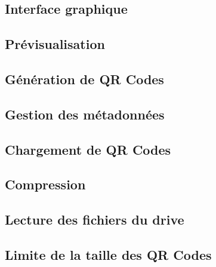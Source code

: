 \documentclass{report}
\begin{document}
		\subsection{Interface graphique}
			 \label{interfaceGraphique}
			
		\subsection{Prévisualisation}
			 \label{previsualisation}
			
		\subsection{Génération de QR Codes}
			 \label{generation}
		
		\newpage
		\subsection{Gestion des métadonnées}
			 \label{metadonnees}
			
		\subsection{Chargement de QR Codes}
			 \label{chargement}
			
		\newpage
		\subsection{Compression}
			 \label{compression}
		
		\newpage
		\subsection{Lecture des fichiers du drive}
			 \label{lectureDrive}
			
		\subsection{Limite de la taille des QR Codes}
			 \label{limiteTaille}
\end{document}
